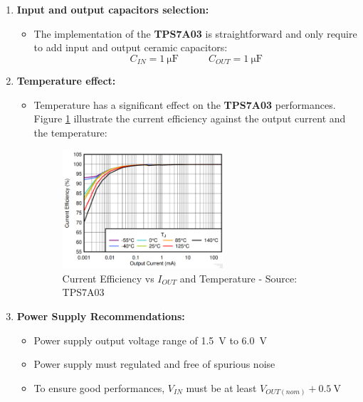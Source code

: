 \documentclass[report.tex]{subfiles}
\begin{document}
\begin{enumerate}
\item \textbf{Input and output capacitors selection:}
\begin{itemize}[\;]
\item The implementation of the \textbf{TPS7A03} is straightforward and only require to add input and output ceramic capacitors: 
$$
\boxed{C_{IN} = \SI{1}{\micro\farad}} \quad \quad \quad \boxed{C_{OUT} = \SI{1}{\micro\farad}}
$$
\end{itemize}
\item \textbf{Temperature effect:}
\begin{itemize}[\;]
\item Temperature has a significant effect on the \textbf{TPS7A03} performances. Figure \ref{fig:tps7a03_temp_car} illustrate the current efficiency against the output current and the temperature:

\begin{figure}[H]
	\centering
	\includegraphics[width=0.6\textwidth]{Include/Figure/comp/tps7a03_temp_car.png}
	\caption{Current Efficiency vs $I_{OUT}$ and Temperature - Source: TPS7A03\cite{TPS7A03}}
	\label{fig:tps7a03_temp_car}
\end{figure}

\end{itemize}
\item \textbf{Power Supply Recommendations:}
\begin{itemize}
\item Power supply output voltage range of \SI{1.5}{\volt} to \SI{6.0}{\volt}
\item Power supply must regulated and free of spurious noise
\item To ensure good performances, $V_{IN}$ must be at least $V_{OUT(nom)} + \SI{0.5}{\volt}$
\end{itemize}
\end{enumerate}

\end{document}
